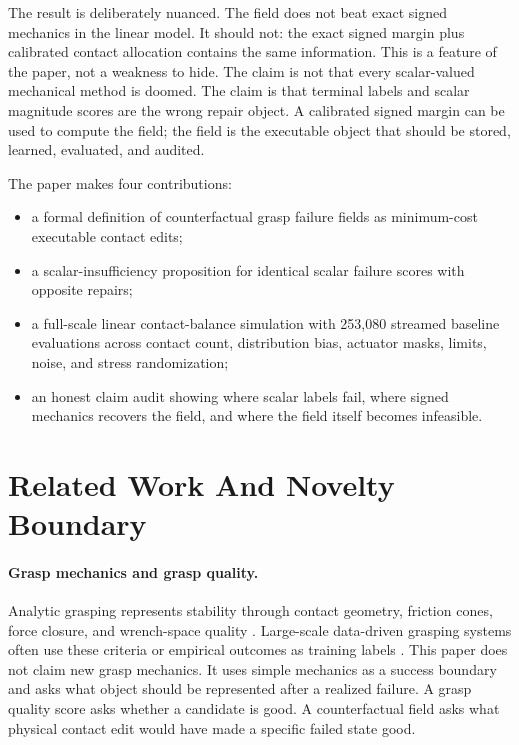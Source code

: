 \documentclass{article}
\begin{document}
The result is deliberately nuanced. The field does not beat exact signed mechanics in the linear model. It should not: the exact signed margin plus calibrated contact allocation contains the same information. This is a feature of the paper, not a weakness to hide. The claim is not that every scalar-valued mechanical method is doomed. The claim is that terminal labels and scalar magnitude scores are the wrong repair object. A calibrated signed margin can be used to compute the field; the field is the executable object that should be stored, learned, evaluated, and audited.

The paper makes four contributions:
\begin{itemize}
    \item a formal definition of counterfactual grasp failure fields as minimum-cost executable contact edits;
    \item a scalar-insufficiency proposition for identical scalar failure scores with opposite repairs;
    \item a full-scale linear contact-balance simulation with 253,080 streamed baseline evaluations across contact count, distribution bias, actuator masks, limits, noise, and stress randomization;
    \item an honest claim audit showing where scalar labels fail, where signed mechanics recovers the field, and where the field itself becomes infeasible.
\end{itemize}

\section{Related Work And Novelty Boundary}

\paragraph{Grasp mechanics and grasp quality.}
Analytic grasping represents stability through contact geometry, friction cones, force closure, and wrench-space quality \citep{ferrari1992planning,bicchi2000robotic,roa2015grasp}. Large-scale data-driven grasping systems often use these criteria or empirical outcomes as training labels \citep{mahler2017dexnet}. This paper does not claim new grasp mechanics. It uses simple mechanics as a success boundary and asks what object should be represented after a realized failure. A grasp quality score asks whether a candidate is good. A counterfactual field asks what physical contact edit would have made a specific failed state good.
\end{document}
